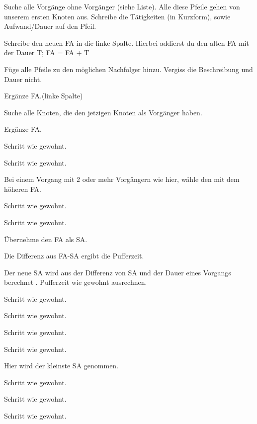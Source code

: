 \documentclass{beamer}
\begin{document}
\begin{frame}[t,shrink=65]
\begin{itemize}
{    \item<only@+> {Suche alle Vorgänge ohne Vorgänger (siehe Liste). Alle diese Pfeile gehen von unserem ersten Knoten aus. Schreibe die Tätigkeiten (in Kurzform), sowie Aufwand/Dauer auf den Pfeil.}
    \item<only@+> {Schreibe den neuen FA in die linke Spalte. Hierbei addierst du den alten FA mit der Dauer T;
                   FA = FA + T}
    \item<only@+> {Füge alle Pfeile zu den möglichen Nachfolger hinzu. Vergiss die Beschreibung und Dauer nicht.}
    \item<only@+> {Ergänze FA.(linke Spalte)}
    \item<only@+> {Suche alle Knoten, die den jetzigen Knoten als Vorgänger haben.}
    \item<only@+> {Ergänze FA.}
    \item<only@+> {Schritt wie gewohnt.}
    \item<only@+> {Schritt wie gewohnt.}
    \item<only@+> {Bei einem Vorgang mit 2 oder mehr Vorgängern wie hier, wähle den mit dem höheren FA.}
    \item<only@+> {Schritt wie gewohnt.}
    \item<only@+> {Schritt wie gewohnt.}
    \item<only@+> {Übernehme den FA als SA.}
    \item<only@+> {Die Differenz aus FA-SA ergibt die Pufferzeit.}
    \item<only@+> {Der neue SA wird aus der Differenz von SA und der Dauer eines Vorgangs berechnet . Pufferzeit wie gewohnt ausrechnen.}
    \item<only@+> {Schritt wie gewohnt.}
    \item<only@+> {Schritt wie gewohnt.}
    \item<only@+> {Schritt wie gewohnt.}
    \item<only@+> {Schritt wie gewohnt.}
    \item<only@+> {Hier wird der kleinste SA genommen.}
    \item<only@+> {Schritt wie gewohnt.}
    \item<only@+> {Schritt wie gewohnt.}
    \item<only@+> {Schritt wie gewohnt.}
    \item \alert<+> {}
}

\end{itemize}

\end{frame}
\end{document}
